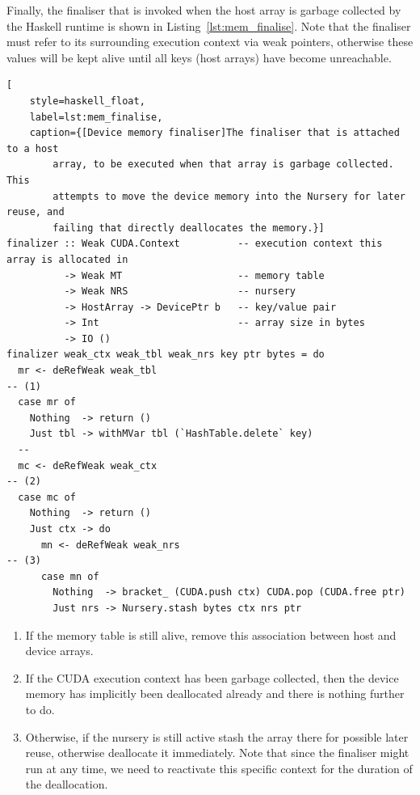 Finally, the finaliser that is invoked when the host array is garbage
collected by the Haskell runtime is shown in Listing~\ref{lst:mem_finalise}.
Note that the finaliser must refer to its surrounding execution context via weak
pointers, otherwise these values will be kept alive until all keys (host arrays)
have become unreachable.
%
\begin{lstlisting}[
    style=haskell_float,
    label=lst:mem_finalise,
    caption={[Device memory finaliser]The finaliser that is attached to a host
        array, to be executed when that array is garbage collected. This
        attempts to move the device memory into the Nursery for later reuse, and
        failing that directly deallocates the memory.}]
finalizer :: Weak CUDA.Context          -- execution context this array is allocated in
          -> Weak MT                    -- memory table
          -> Weak NRS                   -- nursery
          -> HostArray -> DevicePtr b   -- key/value pair
          -> Int                        -- array size in bytes
          -> IO ()
finalizer weak_ctx weak_tbl weak_nrs key ptr bytes = do
  mr <- deRefWeak weak_tbl                                                             -- (1)
  case mr of
    Nothing  -> return ()
    Just tbl -> withMVar tbl (`HashTable.delete` key)
  --
  mc <- deRefWeak weak_ctx                                                             -- (2)
  case mc of
    Nothing  -> return ()
    Just ctx -> do
      mn <- deRefWeak weak_nrs                                                         -- (3)
      case mn of
        Nothing  -> bracket_ (CUDA.push ctx) CUDA.pop (CUDA.free ptr)
        Just nrs -> Nursery.stash bytes ctx nrs ptr
\end{lstlisting}
%
\begin{enumerate}
\item If the memory table is still alive, remove this association between host
    and device arrays.

\item If the CUDA execution context has been garbage collected, then the
    device memory has implicitly been deallocated already and there is nothing
    further to do.

\item Otherwise, if the nursery is still active stash the array there for
    possible later reuse, otherwise deallocate it immediately. Note that since
    the finaliser might run at any time, we need to reactivate this specific
    context for the duration of the deallocation.
\end{enumerate}

